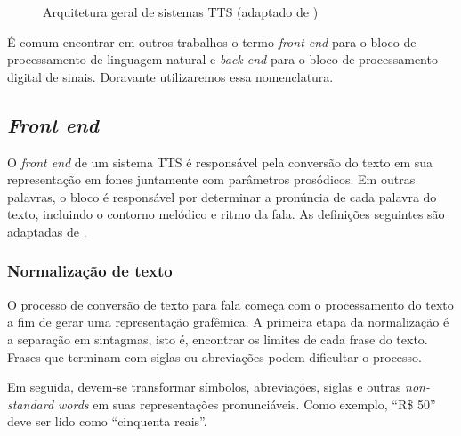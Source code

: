 \begin{figure}[!htbp]
\centering
{}
\caption{Arquitetura geral de sistemas TTS (adaptado de )}
\label{fig:tts-arch}
\end{figure}

É comum encontrar em outros trabalhos o termo \emph{front end} para o
bloco de processamento de linguagem natural e \emph{back end} para o bloco de
processamento digital de sinais. Doravante utilizaremos essa nomenclatura.

\subsection{\emph{Front end}}
O \emph{front end} de um sistema TTS é responsável pela conversão do texto em
sua representação em fones juntamente com parâmetros prosódicos. Em outras
palavras, o bloco é responsável por determinar a pronúncia de cada palavra do
texto, incluindo o contorno melódico e ritmo da fala. As definições seguintes
são adaptadas de .

\subsubsection{Normalização de texto}
O processo de conversão de texto para fala começa com o processamento do texto a
fim de gerar uma representação grafêmica. A primeira etapa da normalização é a
separação em sintagmas, isto é, encontrar os limites de cada frase do texto.
Frases que terminam com siglas ou abreviações podem dificultar o processo.

Em seguida, devem-se transformar símbolos, abreviações, siglas e outras
\emph{non-standard words} em suas representações pronunciáveis. Como exemplo,
``R\$ 50'' deve ser lido como ``cinquenta reais''.


